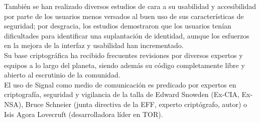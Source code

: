 También se han realizado diversos estudios de cara a su usabilidad y accesibilidad por parte de los usuarios menos versados al buen uso de sus características de seguridad; por desgracia, los estudios demostraron que los usuarios tenían dificultades para identificar una suplantación de identidad, aunque los esfuerzos en la mejora de la interfaz y usabilidad han incrementado. \\

Su base criptográfica ha recibido frecuentes revisiones por diversos expertos y equipos a lo largo del planeta, siendo además su código completamente libre y abierto al escrutinio de la comunidad. \\

El uso de Signal como medio de comunicación es predicado por expertos en criptografía, seguridad y vigilancia de la talla de Edward Snowden (Ex-CIA, Ex-NSA), Bruce Schneier (junta directiva de la EFF, experto criptógrafo, autor) o Isis Agora Lovecruft (desarrolladora líder en TOR). \\
